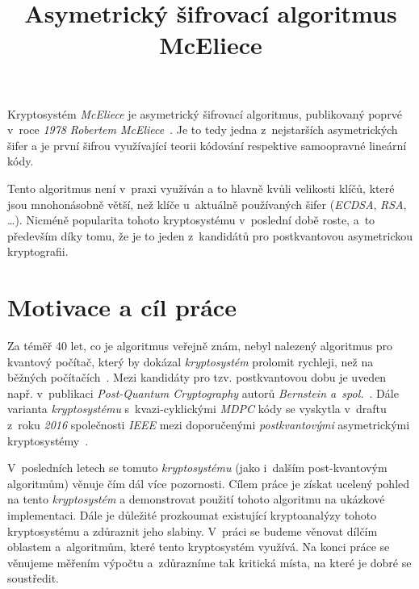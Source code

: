 \documentclass[thesis=M,czech,hidelinks]{FITthesis}[2012/06/26]
\title{Asymetrický šifrovací algoritmus McEliece}
\newcommand{\0}{{\textcolor[gray]{0.75}{0}}}
\begin{document}
\begin{introduction}

Kryptosystém \emph{McEliece} je asymetrický šifrovací algoritmus, publikovaný
poprvé v~roce \emph{1978} \emph{Robertem McEliece}~\cite{McEliece}. Je to tedy
jedna z~nejstarších asymetrických šifer a je první šifrou využívající teorii
kódování respektive samoopravné lineární kódy.

Tento algoritmus není v~praxi využíván a to hlavně kvůli velikosti klíčů, které
jsou mnohonásobně větší, než klíče u~aktuálně používaných šifer (\emph{ECDSA},
\emph{RSA}, \ldots). Nicméně popularita tohoto kryptosystému v~poslední době
roste, a~to především díky tomu, že je to jeden z~kandidátů pro postkvantovou
asymetrickou kryptografii.


\section*{Motivace a cíl práce}

Za téměř 40 let, co je algoritmus veřejně znám, nebyl nalezený algoritmus pro
kvantový počítač, který by dokázal \emph{kryptosystém} prolomit rychleji, než na
běžných počítačích~\cite{Dinh}. Mezi kandidáty pro tzv. postkvantovou dobu je
uveden např. v~publikaci \emph{Post-Quantum Cryptography} autorů \emph{Bernstein
a~spol.}~\cite{Post-Quantum_Cryptography}. Dále varianta \emph{kryptosystému}
s~kvazi-cyklickými \emph{MDPC} kódy se vyskytla v~draftu z~roku \emph{2016}
společnosti \emph{IEEE} mezi doporučenými \emph{postkvantovými} asymetrickými
kryptosystémy~\cite{Schanck}.

V~posledních letech se tomuto \emph{kryptosystému} (jako i~dalším post-kvantovým
algoritmům) věnuje čím dál více pozornosti. Cílem práce je získat ucelený pohled
na tento \emph{kryptosystém} a demonstrovat použití tohoto algoritmu na ukázkové
implementaci. Dále je důležité prozkoumat existující kryptoanalýzy tohoto
kryptosystému a zdůraznit jeho slabiny. V~práci se budeme věnovat dílčím
oblastem a~algoritmům, které tento kryptosystém využívá. Na konci práce se
věnujeme měřením výpočtu a~zdůrazníme tak kritická místa, na které je dobré se
soustředit.



\end{introduction}
\end{document}
